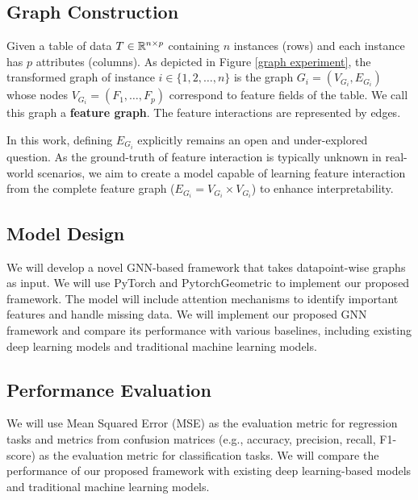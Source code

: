\subsection{Graph Construction} \label{construction}
Given a table of data $ T \in \mathbb{R}^{n\times p} $ containing $ n $ instances (rows) and each instance has $ p $ attributes (columns). 
As depicted in Figure \ref{graph experiment}, the transformed graph of instance $ i \in \{1,2,\dots,n\} $ is the graph $ G_i = (V_{G_i},E_{G_i}) $ whose nodes $ V_{G_i} = (F_1,\dots,F_p) $ correspond to feature fields of the table.
We call this graph a \textbf{feature graph}. 
The feature interactions are represented by edges.

In this work, defining $E_{G_i}$ explicitly remains an open and under-explored question. As the ground-truth of feature interaction is typically unknown in real-world scenarios, we aim to create a model capable of learning feature interaction from the complete feature graph ($E_{G_i} = V_{G_i} \times V_{G_i}$) to enhance interpretability.

\begin{figure*}[h]
	\centering
	\caption{an example of construction of graphs from tabular data}
	\label{graph experiment}
\end{figure*}

\subsection{Model Design}
We will develop a novel GNN-based framework that takes datapoint-wise graphs as input. We will use PyTorch \cite{PyTorch} and PytorchGeometric \cite{PyG} to implement our proposed framework. The model will include attention mechanisms to identify important features and handle missing data.
We will implement our proposed GNN framework and compare its performance with various baselines, including existing deep learning models and traditional machine learning models.

\subsection{Performance Evaluation}
We will use Mean Squared Error (MSE) as the evaluation metric for regression tasks and metrics from confusion matrices (e.g., accuracy, precision, recall, F1-score) as the evaluation metric for classification tasks. We will compare the performance of our proposed framework with existing deep learning-based models and traditional machine learning models.


